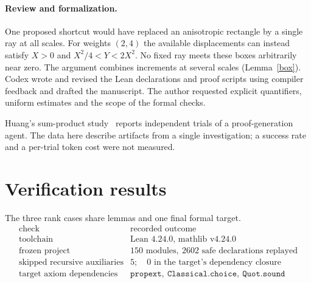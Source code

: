 \documentclass[11pt,letterpaper]{article}
\begin{document}
\paragraph{Review and formalization.} One proposed shortcut would have
replaced an anisotropic rectangle by a single ray at all scales. For
weights $(2,4)$ the available displacements can instead satisfy
$X>0$ and $X^2/4<Y<2X^2$. No fixed ray meets these boxes arbitrarily near
zero. The argument combines increments at several scales (Lemma~\ref{box}).
Codex wrote and revised the Lean declarations and proof scripts using
compiler feedback and drafted the manuscript. The author requested
explicit quantifiers, uniform estimates and the scope of the formal checks.

Huang's sum-product study~\cite{huang} reports independent trials of
a proof-generation agent. The data here describe artifacts from a single
investigation; a success rate and a per-trial token cost were not measured.

\section{Verification results}
The three rank cases share lemmas and one final formal target.
\[
\begin{array}{l|l}
\text{check} & \text{recorded outcome}\\ \hline
\text{toolchain} & \text{Lean 4.24.0, mathlib v4.24.0}\\
\text{frozen project} & 150\text{ modules},\ 2602\text{ safe declarations replayed}\\
\text{skipped recursive auxiliaries} &5;\quad 0\text{ in the target's dependency closure}\\
\text{target axiom dependencies} &\texttt{propext},\ \texttt{Classical.choice},\ \texttt{Quot.sound}
\end{array}
\]
\end{document}
